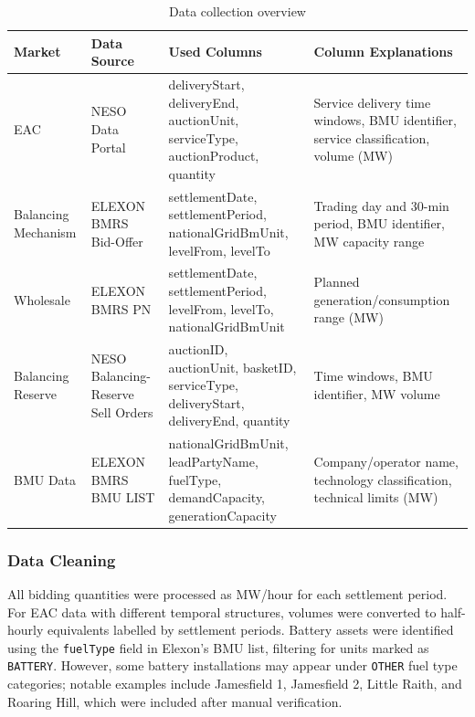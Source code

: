 \documentclass[12pt,a4paper]{article}
\begin{document}
\begin{table}[H]
\centering
\caption{Data collection overview}
\label{tab:datasources}
\begin{tabular}{@{}>{\raggedright\arraybackslash}p{2.2cm}
                >{\centering\arraybackslash}p{2.5cm}
                >{\raggedright\arraybackslash}p{5.5cm}
                >{\raggedright\arraybackslash}p{4.8cm}@{}}
\toprule
Market & Data Source & Used Columns & Column Explanations \\ \midrule
EAC & NESO Data Portal & deliveryStart, deliveryEnd, auctionUnit, serviceType, auctionProduct, quantity & Service delivery time windows, BMU identifier, service classification, volume (MW) \\
Balancing Mechanism & ELEXON BMRS Bid-Offer & settlementDate, settlementPeriod, nationalGridBmUnit, levelFrom, levelTo & Trading day and 30-min period, BMU identifier, MW capacity range \\
Wholesale & ELEXON BMRS PN & settlementDate, settlementPeriod, levelFrom, levelTo, nationalGridBmUnit & Planned generation/consumption range (MW) \\
Balancing Reserve & NESO Balancing-Reserve Sell Orders & auctionID, auctionUnit, basketID, serviceType, deliveryStart, deliveryEnd, quantity & Time windows, BMU identifier, MW volume \\
BMU Data & ELEXON BMRS BMU LIST & nationalGridBmUnit, leadPartyName, fuelType, demandCapacity, generationCapacity & Company/operator name, technology classification, technical limits (MW) \\
\bottomrule
\end{tabular}
\end{table}

\subsubsection{Data Cleaning}
All bidding quantities were processed as MW/hour for each settlement period. For EAC data with different temporal structures, volumes were converted to half-hourly equivalents labelled by settlement periods. Battery assets were identified using the \texttt{fuelType} field in Elexon's BMU list, filtering for units marked as \texttt{BATTERY}. However, some battery installations may appear under \texttt{OTHER} fuel type categories; notable examples include Jamesfield 1, Jamesfield 2, Little Raith, and Roaring Hill, which were included after manual verification.
\end{document}
